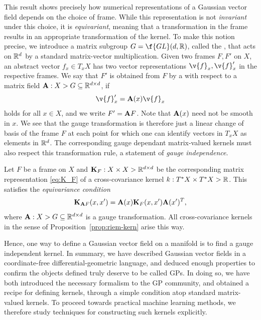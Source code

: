 This result shows precisely how numerical representations of a Gaussian vector field depends on the choice of frame.
While this representation is not \emph{invariant} under this choice, it is \emph{equivariant}, meaning that a transformation in the frame results in an appropriate transformation of the kernel.
To make this notion precise, we introduce a matrix subgroup $G = \f{GL}(d, \R)$, called the , that acts on $\mathbb{R}^d$ by a standard matrix-vector multiplication.
Given two frames $F, F'$ on $X$, an abstract vector $f_x \in T_xX$ has two vector representations $\v{f}_x, \v{f}'_x$ in the respective frames.
We say that $F'$ is obtained from $F$ by a  with respect to a matrix field $\m{A}: X \-> G \subseteq \R^{d \x d}$, if \[ \v{f}'_x = \m{A}(x) \v{f}_x \] holds for all $x \in X$, and we write $F' = \m{A}F$.
Note that $\m{A}(x)$ need not be smooth in $x$.
We see that the gauge transformation is therefore just a linear change of basis of the frame $F$ at each point for which one can identify vectors in $T_xX$ as elements in $\mathbb{R}^d$.
The corresponding gauge dependant matrix-valued kernels must also respect this transformation rule, a statement of \emph{gauge independence}.

\begin{corollary}
	\label{cor:equivariance}
	Let $F$ be a frame on $X$ and $\m{K}_F : X \x X \-> \R^{d\x d}$ be the corresponding matrix representation \eqref{eq:K_F} of a cross-covariance kernel $k: T^*X \times T^*X \-> \mathbb{R}$.
	This satisfies the \emph{equivariance condition} \[ \m{K}_{\m{A} F}(x, x') = \m{A}(x) \m{K}_{F}(x,x') \m{A}(x')^T, \] where $\m{A} : X \-> G \subseteq \R^{d \x d}$ is a gauge transformation.
	All cross-covariance kernels in the sense of Proposition~\ref{prop:riem-kern} arise this way.
\end{corollary}

Hence, one way to define a Gaussian vector field on a manifold is to find a gauge independent kernel.
In summary, we have described Gaussian vector fields in a coordinate-free differential-geometric language, and deduced enough properties to confirm the objects defined truly deserve to be called GPs.
In doing so, we have both introduced the necessary formalism to the GP community, and obtained a recipe for defining kernels, through a simple condition atop standard matrix-valued kernels.
To proceed towards practical machine learning methods, we therefore study techniques for constructing such kernels explicitly.

